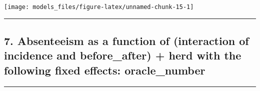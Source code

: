 \documentclass[]{article}
\begin{document}
\begin{center}\texttt{[image: models\_files/figure-latex/unnamed-chunk-15-1]} \end{center}

\newpage

\begin{center}\rule{0.5\linewidth}{\linethickness}\end{center}

\subsection{7. Absenteeism as a function of (interaction of incidence
and before\_after) + herd with the following fixed effects:
oracle\_number}\label{absenteeism-as-a-function-of-interaction-of-incidence-and-before_after-herd-with-the-following-fixed-effects-oracle_number}

\begin{center}\rule{0.5\linewidth}{\linethickness}\end{center}
\end{document}
